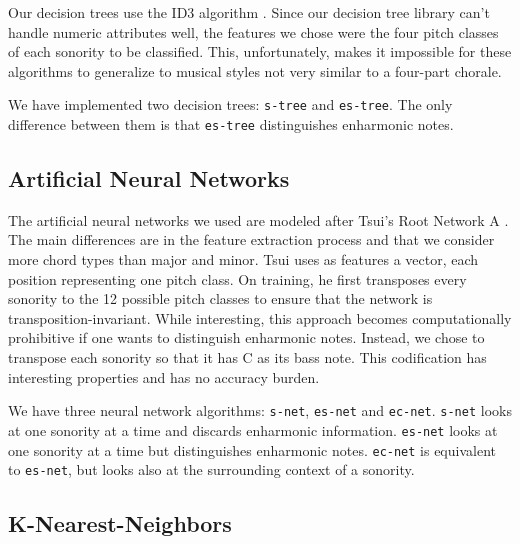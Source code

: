 \documentclass{article}
\newcommand{\comment}[1]{}
\begin{document}
\comment{
  ==> ID3 algorithm
  ==> features: sequência de pitches
  ==> dependência em quatro vozes 
}

Our decision trees use the ID3 algorithm
\cite{mitchell:machine}. Since our decision tree library can't handle
numeric attributes well, the features we chose were the four pitch
classes of each sonority to be classified. This, unfortunately,
makes it impossible for these algorithms to generalize to musical
styles not very similar to a four-part chorale.

We have implemented two decision trees: \texttt{s-tree} and
\texttt{es-tree}. The only difference between them is that
\texttt{es-tree} distinguishes enharmonic notes.

\subsection{Artificial Neural Networks}
\label{sec:neural-net}

\comment{
  ==> features são weighted pitch counts
  ==> simple/enharmonic-simple/context
}

The artificial neural networks we used are modeled after Tsui's Root
Network A \cite{tsui:harmonic}. The main differences are in the
feature extraction process and that we consider more chord types than
major and minor. Tsui \cite{tsui:harmonic} uses as features a vector,
each position representing one pitch class. On training, he first
transposes every sonority to the 12 possible pitch classes to ensure
that the network is transposition-invariant. While interesting, this
approach becomes computationally prohibitive if one wants to
distinguish enharmonic notes. Instead, we chose to transpose each
sonority so that it has C as its bass note. This codification has
interesting properties and has no accuracy burden.

We have three neural network algorithms: \texttt{s-net},
\texttt{es-net} and \texttt{ec-net}. \texttt{s-net} looks at one
sonority at a time and discards enharmonic information. \texttt{es-net}
looks at one sonority at a time but distinguishes enharmonic
notes. \texttt{ec-net} is equivalent to \texttt{es-net}, but looks
also at the surrounding context of a sonority.

\subsection{K-Nearest-Neighbors}
\label{sec:knn}

\comment{
  ==> baseline (similar a pardo, templates automaticos)
  ==> good theoretical performance (citar \cite{fix.ea:important}) 
  ==> very good practical performance (citar
  \cite{gomez.ea:estimating})
}
\end{document}
